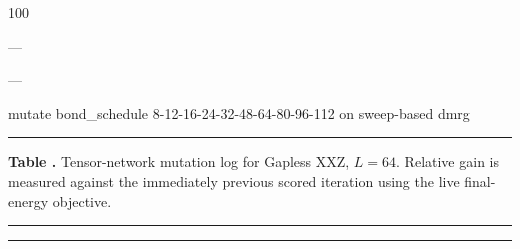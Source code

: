 \noindent\parbox[t]{0.05\linewidth}{\centering\strut 100}\hspace{0.006\linewidth}\parbox[t]{0.04\linewidth}{\centering\strut {}}\hspace{0.006\linewidth}\parbox[t]{0.10\linewidth}{\centering\strut ---}\hspace{0.006\linewidth}\parbox[t]{0.115\linewidth}{\centering\strut ---}\hspace{0.006\linewidth}\parbox[t]{0.671\linewidth}{mutate bond\_schedule 8-12-16-24-32-48-64-80-96-112 on sweep-based dmrg}\par\smallskip
\noindent\rule{\linewidth}{0.5pt}
\par\medskip

\medskip

\label{tab:supp_tn_log_xxz_gapless_64}
\noindent\textbf{Table \thetable.} Tensor-network mutation log for Gapless XXZ, $L=64$. Relative gain is measured against the immediately previous scored iteration using the live final-energy objective.
\par\medskip
\noindent\rule{\linewidth}{0.5pt}
\par\smallskip
\noindent\rule{\linewidth}{0.5pt}
\par\smallskip
